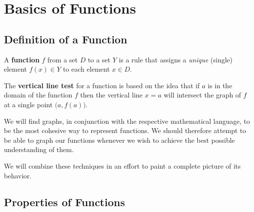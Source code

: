 \chapter{Basics of Functions}
\section{Definition of a Function}

\begin{defn}
  A \textbf{function} \(f\) from a set \(D\) to a set \(Y\) is a rule that assigns a \emph{unique} (single) element \(f(x) \in Y\) to each element \(x \in D\).
\end{defn}

\begin{defn}
  The \textbf{vertical line test} for a function is based on the idea that if \(a\) is in the domain of the function \(f\) then the vertical line \(x=a\) will intersect the graph of \(f\) at a single point \( \big(a,f(a)\big)\).
\end{defn}

%

We will find graphs, in conjunction with the respective mathematical language, to be the most cohesive way to represent functions.
We should therefore attempt to be able to graph our functions whenever we wish to achieve the best possible understanding of them.

We will combine these techniques in an effort to paint a complete picture of its behavior.

\section{Properties of Functions}


